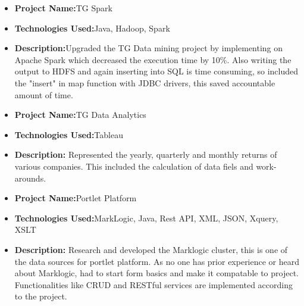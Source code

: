 \documentclass[11pt,a4paper,sans]{moderncv}        %
\begin{document}
\vspace{6pt}

\begin{itemize}
\item{\textbf{Project Name:}TG Spark}
\item{\textbf{Technologies Used:}Java, Hadoop, Spark}
\item{\textbf{Description:}Upgraded the TG Data mining project by implementing on Apache Spark which decreased the execution time by 10\%. Also writing the output to HDFS and again inserting into SQL is time consuming, so included the "insert" in map function with JDBC drivers, this saved accountable amount of time.}
\end{itemize}


\vspace{6pt}

\begin{itemize}
\item{\textbf{Project Name:}TG Data Analytics}
\item{\textbf{Technologies Used:}Tableau}
\item{\textbf{Description:} Represented the yearly, quarterly and monthly returns of various companies. This included the calculation of data fiels and work-arounds.}
\end{itemize}


\vspace{6pt}

\begin{itemize}
\item{\textbf{Project Name:}Portlet Platform}
\item{\textbf{Technologies Used:}MarkLogic, Java, Rest API, XML, JSON, Xquery, XSLT}
\item{\textbf{Description:} Research and developed the Marklogic cluster, this is one of the data sources for portlet platform. As no one has prior experience or heard about Marklogic, had to start form basics and make it compatable to project. Functionalities like CRUD and RESTful services are implemented according to the project.}
\end{itemize}
\end{document}
